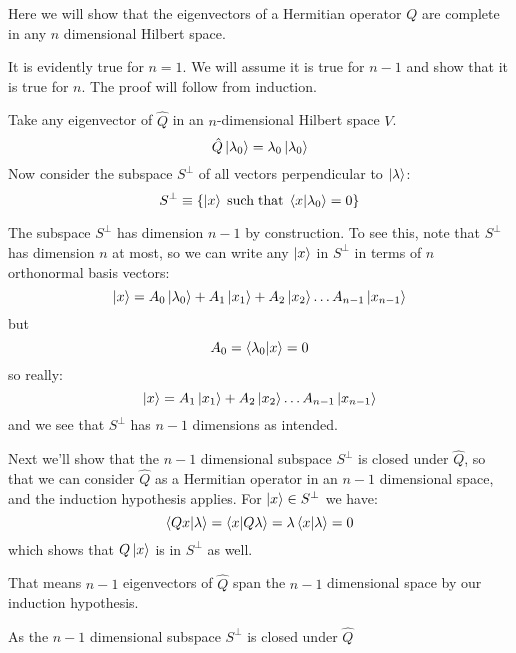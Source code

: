 \documentclass[12pt]{book}
\begin{document}
Here we will show that the eigenvectors of a Hermitian operator $Q$ are complete in any $n$ dimensional Hilbert space.

It is evidently true for $n=1$.  We will assume it is true for $n-1$ and show that it is true for $n$.  The proof will follow from induction.

Take any eigenvector of $\hat{Q}$ in an $n$-dimensional Hilbert space  $V$.
$$\hat{Q}\ket{\lambda_0} = \lambda_0 \ket{\lambda_0}$$
Now consider the subspace $S^\perp$ of all vectors perpendicular to $\ket{\lambda}$:
$$S^\perp \equiv \{ \ket{x} \; {\rm such \; that} \; \braket{x|\lambda_0}=0 \}$$

The subspace $S^\perp$ has dimension $n-1$ by construction.  To see this, note that $S^\perp$ has dimension $n$ at most, so we can write any $\ket{x}$ in $S^\perp$ in terms of $n$ orthonormal basis vectors:
$$\ket{x} = A_0 \ket{\lambda_0} + A_1 \ket{x_1} + A_2 \ket{x_2} \ldots A_{n-1} \ket{x_{n-1}}$$
but
$$A_0 = \braket{\lambda_0|x} = 0$$
so really:
$$\ket{x} = A_1 \ket{x_1} + A_2 \ket{x_2} \ldots A_{n-1} \ket{x_{n-1}}$$
and we see that $S^\perp$ has $n-1$ dimensions as intended.

Next we'll show that the $n-1$ dimensional subspace $S^\perp$ is closed under $\hat{Q}$, so that 
we can consider $\hat{Q}$ as a Hermitian operator in an $n-1$ dimensional space, and the induction hypothesis applies.  For $\ket{x} \in S^\perp$ we have:
$$\braket{Qx|\lambda} = \braket{x| Q\lambda} = \lambda \braket{x|\lambda} = 0$$
which shows that $Q\ket{x}$ is in $S^\perp$ as well.  

That means $n-1$ eigenvectors of $\hat{Q}$ span the $n-1$ dimensional space by our induction hypothesis.  

As the $n-1$ dimensional subspace $S^\perp$ is closed under $\hat{Q}$ 
\end{document}
